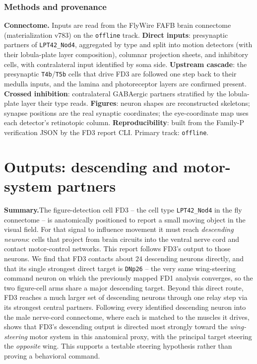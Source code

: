 \documentclass[11pt]{article}
\newcommand{\ttt}[1]{\texttt{#1}}
\begin{document}
\section{Methods and provenance}

\textbf{Connectome.} Inputs are read from the FlyWire FAFB brain connectome (materialization v783) on the \ttt{offline} track. \textbf{Direct inputs}: presynaptic partners of \ttt{LPT42\_Nod4}, aggregated by type and split into motion detectors (with their lobula-plate layer composition), columnar projection sheets, and inhibitory cells, with contralateral input identified by soma side. \textbf{Upstream cascade}: the presynaptic \ttt{T4b}/\ttt{T5b} cells that drive FD3 are followed one step back to their medulla inputs, and the lamina and photoreceptor layers are confirmed present. \textbf{Crossed inhibition}: contralateral GABAergic partners stratified by the lobula-plate layer their type reads. \textbf{Figures}: neuron shapes are reconstructed skeletons; synapse positions are the real synaptic coordinates; the eye-coordinate map uses each detector's retinotopic column. \textbf{Reproducibility}: built from the Family-P verification JSON by the FD3 report CLI. Primary track: \ttt{offline}.

\clearpage\part{Outputs: descending and motor-system partners}

\textbf{Summary.}\quad The figure-detection cell FD3 -- the cell type \ttt{LPT42\_Nod4} in the fly connectome -- is anatomically positioned to report a small moving object in the visual field. For that signal to influence movement it must reach \emph{descending neurons}: cells that project from brain circuits into the ventral nerve cord and contact motor-control networks. This report follows FD3's output to those neurons. We find that FD3 contacts about 24 descending neurons directly, and that its single strongest direct target is \ttt{DNp26} -- the very same wing-steering command neuron on which the previously mapped FD1 analysis converges, so the two figure-cell arms share a major descending target. Beyond this direct route, FD3 reaches a much larger set of descending neurons through one relay step via its strongest central partners. Following every identified descending neuron into the male nerve-cord connectome, where each is matched to the muscles it drives, shows that FD3's descending output is directed most strongly toward the \emph{wing-steering} motor system in this anatomical proxy, with the principal target steering the \emph{opposite} wing. This supports a testable steering hypothesis rather than proving a behavioral command.
\end{document}
